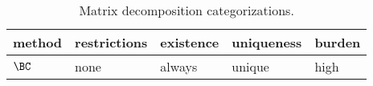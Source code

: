 \begin{table}[htdp]
\caption[Matrix decomposition categorizations]{Matrix decomposition categorizations.}
\begin{center}
\begin{tabular}{lllll}
%
  method & restrictions & existence & uniqueness & burden \\\hline
%
  $\BC$ & none & always & unique & high
%
\end{tabular}
\end{center}
\label{tab:pantheon:properties}
\end{table}

\endinput